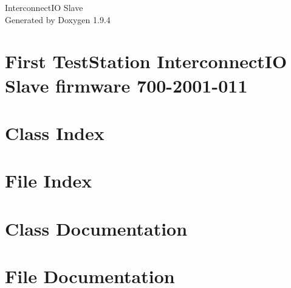 \documentclass[twoside]{book}
\newcommand{\+}{\discretionary{\mbox{\scriptsize$\hookleftarrow$}}{}{}}
\newcommand{\clearemptydoublepage}{%
    \newpage{\pagestyle{empty}\cleardoublepage}%
  }
\begin{document}
  \raggedbottom
    \hypersetup{pageanchor=false,
                bookmarksnumbered=true,
                pdfencoding=unicode
               }
  \begin{titlepage}
  \vspace*{7cm}
  \begin{center}%
  {\Large Interconnect\+IO Slave}\\
  \vspace*{1cm}
  {\large Generated by Doxygen 1.9.4}\\
  \end{center}
  \end{titlepage}
  \clearemptydoublepage
  \tableofcontents
  \clearemptydoublepage
  \hypersetup{pageanchor=true}
\chapter{First Test\+Station Interconnect\+IO Slave firmware 700-\/2001-\/011}
\label{md_README}

\chapter{Class Index}

\chapter{File Index}

\chapter{Class Documentation}


\chapter{File Documentation}





  \backmatter
  \newpage
  \clearemptydoublepage
  \printindex
\end{document}
